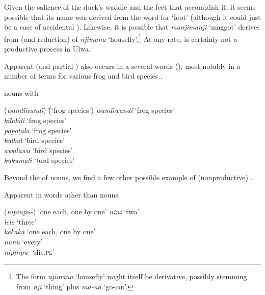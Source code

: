 Given the salience of the duck’s waddle and the feet that accomplish it, it seems possible that its name was derived from the word for ‘foot’ (although it could just be a case of accidental ). Likewise, it is possible that \textit{manjimanji} ‘maggot’ derives from  (and reduction) of \textit{njimana} ‘housefly’.\footnote{The form \textit{njimana} ‘housefly’ might itself be derivative, possibly stemming from \textit{nji} ‘thing’ plus \textit{ma-na} ‘go-\textsc{irr}’.} At any rate,  is certainly not a productive  process in Ulwa.

Apparent  (and partial ) also occurs in a several  words (), most notably in a number of terms for various frog and bird species .

    \ea%
    \label{ex:nouns:46b}
           nouns with \\
\begin{tabbing}
{(\textit{wandïwandï})} \= {(‘frog species’)}\kill
{\textit{wandïwandï}} \> {‘frog species’}\\
{\textit{kïlakïli}} \> {‘frog species’}\\
{\textit{popotala}} \> {‘frog species’}\\
{\textit{kulkul}} \> {‘bird species’}\\
{\textit{awalawa}} \> {‘bird species’}\\
{\textit{kukumali}} \> {‘bird species’}
\end{tabbing}
      
\z

Beyond the  of nouns, we find a few other possible example of (nonproductive)  .

      \ea%
    \label{ex:nouns:46c}
          Apparent  in words other than nouns\\
\begin{tabbing}
{(\textit{nipinpu-})} \= {‘one each, one by one’}\kill
{\textit{nini}} \> {‘two’}\\
{\textit{lele}} \> {‘three’}\\
{\textit{kekaka}} \> {‘one each, one by one’}\\
{\textit{nunu}} \> {‘every’}\\
{\textit{nipinpu-}} \> {‘die.\textsc{pl}’}
\end{tabbing}
  \z

